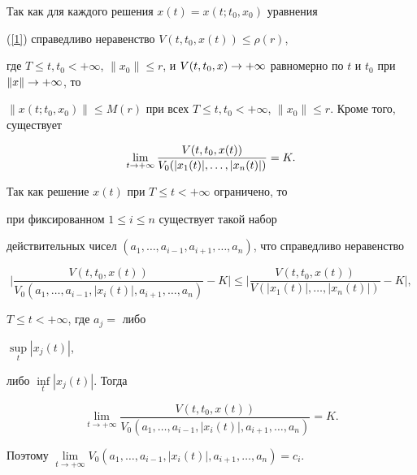 \begin{pf}


Так как для каждого решения $x(t)=x(t;t_{0},x_{0})$ уравнения


(\ref{1}) справедливо неравенство $V(t,t_{0},x(t))\leq\rho (r)$,


где $T\leq t,t_{0}<+\infty$, $\|x_{0}\|\leq r$, и $V(t,t_{0},x)\rar


+\infty$ равномерно по $t$ и $t_{0}$ при $\|x\|\rar +\infty$, то


$\|x(t;t_{0},x_{0})\|\leq M(r)$ при всех $T\leq


t,t_{0}<+\infty$, $\|x_{0}\|\leq r$. Кроме того, существует


$$


\lim\limits_{t\rar


+\infty}\frac{V(t,t_{0},x(t))}{V_{0}(|x_{1}(t)|,


\dotsc,|x_{n}(t)|)}=K.


$$


Так как решение $x(t)$ при $T\leq t< +\infty$ ограничено, то


при фиксированном $1\leq i \leq n$ существует такой набор


действительных чисел $(a_{1},\dotsc,a_{i-


1},a_{i+1},\dotsc,a_{n})$, что справедливо неравенство


$$


\bigg|\frac{V(t,t_{0},x(t))}{V_{0}(a_{1},\dotsc,a_{i-


1},|x_{i}(t)|,a_{i+1}, \dotsc,a_{n})}-K\bigg|\leq


\bigg|\frac{V(t,t_{0},x(t))}{V(|x_{1}(t)|,\dotsc,|x_{n}(t)|)}-


K\bigg|,


$$


$T\leq t< +\infty$, где $a_{j}=$ либо


$\sup\limits_{t}|x_{j}(t)|$,


либо $\inf\limits_{t}|x_{j}(t)|$. Тогда


$$


\lim\limits_{t\rightarrow


+\infty}\frac{V(t,t_{0},x(t))}{V_{0}(a_{1}, \dotsc,a_{i-


1},|x_{i}(t)|,a_{i+1},\dotsc,a_{n})}=K.


$$


Поэтому $\lim\limits_{t\rightarrow +\infty}V_{0}(a_{1},


\dotsc,a_{i-1},|x_{i}(t)|,a_{i+1},\dotsc,a_{n})=c_{i}$.



\end{pf}
